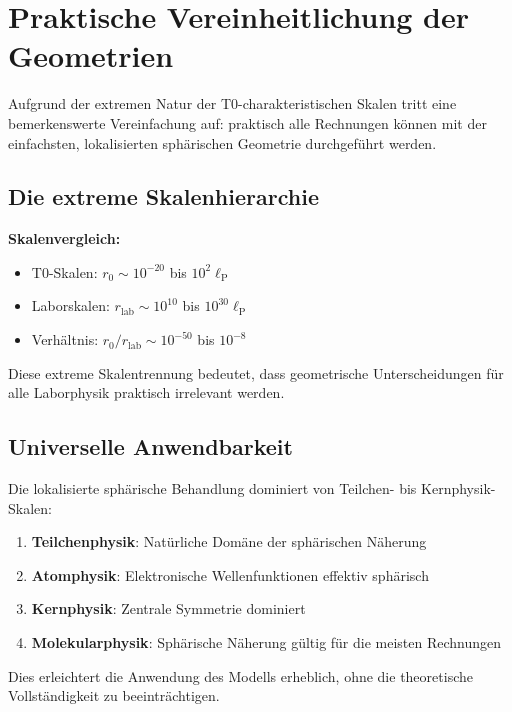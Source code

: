 \documentclass[12pt,a4paper]{report}
\newcommand{\lP}{\ell_{\text{P}}}         %
\newcommand{\rzero}{r_0}                  %
\begin{document}
	\section{Praktische Vereinheitlichung der Geometrien}
	\label{sec:practical_unification}
	
	Aufgrund der extremen Natur der T0-charakteristischen Skalen tritt eine bemerkenswerte Vereinfachung auf: praktisch alle Rechnungen können mit der einfachsten, lokalisierten sphärischen Geometrie durchgeführt werden.
	
	\subsection{Die extreme Skalenhierarchie}
	\label{subsec:extreme_scale_hierarchy}
	
	\textbf{Skalenvergleich:}
	\begin{itemize}
		\item T0-Skalen: $\rzero \sim 10^{-20}$ bis $10^{2} \lP$
		\item Laborskalen: $r_{\text{lab}} \sim 10^{10}$ bis $10^{30} \lP$
		\item Verhältnis: $\rzero/r_{\text{lab}} \sim 10^{-50}$ bis $10^{-8}$
	\end{itemize}
	
	Diese extreme Skalentrennung bedeutet, dass geometrische Unterscheidungen für alle Laborphysik praktisch irrelevant werden.
	
	\subsection{Universelle Anwendbarkeit}
	\label{subsec:universal_applicability}
	
	Die lokalisierte sphärische Behandlung dominiert von Teilchen- bis Kernphysik-Skalen:
	\begin{enumerate}
		\item \textbf{Teilchenphysik}: Natürliche Domäne der sphärischen Näherung
		\item \textbf{Atomphysik}: Elektronische Wellenfunktionen effektiv sphärisch
		\item \textbf{Kernphysik}: Zentrale Symmetrie dominiert
		\item \textbf{Molekularphysik}: Sphärische Näherung gültig für die meisten Rechnungen
	\end{enumerate}
	
	Dies erleichtert die Anwendung des Modells erheblich, ohne die theoretische Vollständigkeit zu beeinträchtigen.
	
\end{document}
